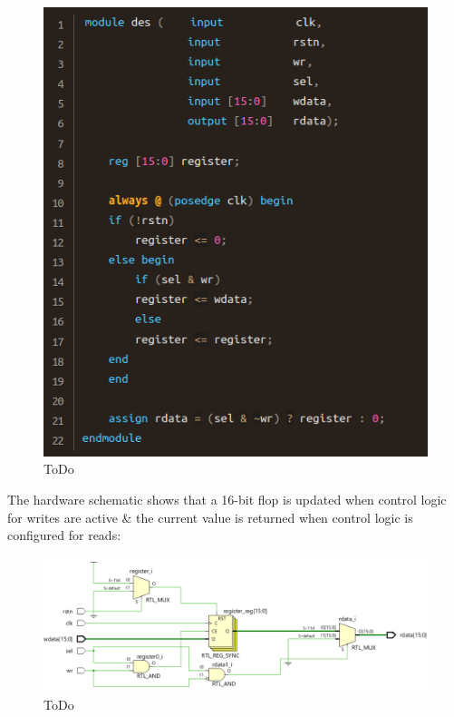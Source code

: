 \documentclass{article}
\begin{document}
	\begin{figure}[H]
		\includegraphics[width=\linewidth]{VerilogPics/figure_23.png}
		\caption{ToDo}
		\label{ToDo}
	\end{figure}
	
	The hardware schematic shows that a 16-bit flop is updated when control logic for writes are active \& the current value is returned when control logic is configured for reads:

	\begin{figure}[H]
		\includegraphics[width=\linewidth]{VerilogPics/figure_24.png}
		\caption{ToDo}
		\label{ToDo}
	\end{figure}
\end{document}

